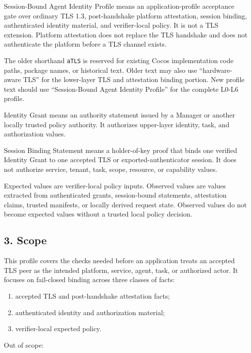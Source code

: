 \documentclass[
]{article}
\providecommand{\tightlist}{%
  \setlength{\itemsep}{0pt}\setlength{\parskip}{0pt}}
\begin{document}
Session-Bound Agent Identity Profile means an application-profile
acceptance gate over ordinary TLS 1.3, post-handshake platform
attestation, session binding, authenticated identity material, and
verifier-local policy. It is not a TLS extension. Platform attestation
does not replace the TLS handshake and does not authenticate the
platform before a TLS channel exists.

The older shorthand \texttt{aTLS} is reserved for existing Cocos
implementation code paths, package names, or historical text. Older
text may also use ``hardware-aware TLS'' for the lower-layer TLS and
attestation binding portion. New profile text should use
``Session-Bound Agent Identity Profile'' for the complete L0-L6 profile.

Identity Grant means an authority statement issued by a Manager or
another locally trusted policy authority. It authorizes upper-layer
identity, task, and authorization values.

Session Binding Statement means a holder-of-key proof that binds one
verified Identity Grant to one accepted TLS or exported-authenticator
session. It does not authorize service, tenant, task, scope, resource,
or capability values.

Expected values are verifier-local policy inputs. Observed values are
values extracted from authenticated grants, session-bound statements,
attestation claims, trusted manifests, or locally derived request state.
Observed values do not become expected values without a trusted local
policy decision.

\subsection{3. Scope}\label{scope}

This profile covers the checks needed before an application treats an
accepted TLS peer as the intended platform, service, agent, task, or
authorized actor. It focuses on fail-closed binding across three classes
of facts:

\begin{enumerate}
\def\labelenumi{\arabic{enumi}.}
\tightlist
\item
  accepted TLS and post-handshake attestation facts;
\item
  authenticated identity and authorization material;
\item
  verifier-local expected policy.
\end{enumerate}

Out of scope:
\end{document}
